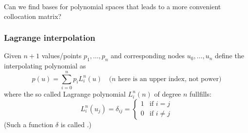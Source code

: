 Can we find bases for polynomial spaces that leads to a more convenient collocation matrix?

\subsubsection{Lagrange interpolation}
Given $n + 1$ values/points
$p_1, \dots, p_n$ and corresponding nodes $u_0, \dots, u_n$
define the interpolating polynomial as
\[
    p(u) = \sum_{i = 0}^n p_i L_i^n(u) \quad \text{($n$ here is an upper index, not power)}
\]
where the so called Lagrange polynomial $L_i^n(n)$ of degree $n$
fullfills:
\[
    L_i^n(u_j) = \delta_{ij} = \begin{cases}
        1 & \text{if } i = j\\
        0 & \text{if } i \ne j
    \end{cases}
\]
(Such a function $\delta$ is called .)
\newpage
